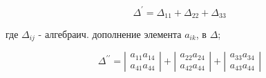 \documentclass[10pt]{article}
\begin{document}
\[

\Delta^{\prime}=\Delta_{11}+\Delta_{22}+\Delta_{33}

\]



где $\Delta_{i j}$ - алгебраич. дополнение элемента $a_{i k}$, в $\Delta$;



\[

\Delta^{\prime \prime}=\left|\begin{array}{l}

a_{11} a_{14} \\

a_{41} a_{44}

\end{array}\right|+\left|\begin{array}{l}

a_{22} a_{24} \\

a_{42} a_{44}

\end{array}\right|+\left|\begin{array}{l}

a_{33} a_{34} \\

a_{43} a_{44}

\end{array}\right|

\]
\end{document}

